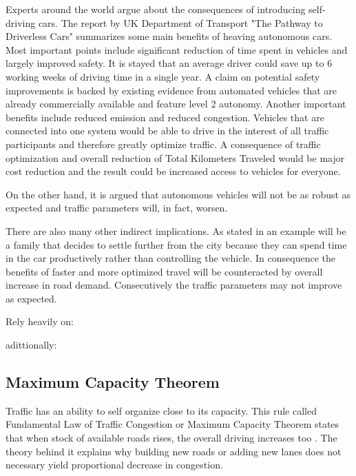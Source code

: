 \documentclass[11pt]{article}
\begin{document}
Experts around the world argue about the consequences of introducing self-driving cars. The report by UK Department of Transport "The Pathway to Driverless Cars" summarizes some main benefits of heaving autonomous cars. Most important points include significant reduction of time spent in vehicles and largely improved safety. It is stayed that an average driver could save up to 6 working weeks of driving time in a single year. A claim on potential safety improvements is backed by existing evidence from automated vehicles that are already commercially available and feature level 2 autonomy. Another important benefits include reduced emission and reduced congestion. Vehicles that are connected into one system would be able to drive in the interest of all traffic participants and therefore greatly optimize traffic. 
A consequence of traffic optimization and overall reduction of Total Kilometers Traveled would be major cost reduction and the result could be increased access to vehicles for everyone\citep{pathwaytodriverless}.


On the other hand, it is argued that autonomous vehicles will not be as robust as expected and traffic parameters will, in fact, worsen\citep{sivak2015road}.

There are also many other indirect implications. As stated in \citep{litman2014autonomous} an example will be a family that decides to settle further from the city because they can spend time in the car productively rather than controlling the vehicle. In consequence the benefits of faster and more optimized travel will be counteracted by overall increase in road demand. Consecutively the traffic parameters may not improve as expected.




Rely heavily on:
\citep{litman2014autonomous}

adittionally:





\subsection{Maximum Capacity Theorem}
Traffic has an ability to self organize close to its capacity. This rule called Fundamental Law of Traffic Congestion or Maximum Capacity Theorem states that when stock of available roads rises, the overall driving increases too \citep{duranton2011fundamental}. The theory behind it explains why building new roads or adding new lanes does not necessary yield proportional decrease in congestion.
\end{document}
